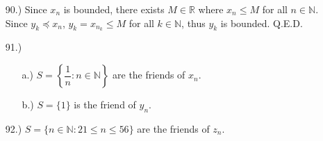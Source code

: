 \documentclass[12pt]{article}
\begin{document}
\begin{itemize}






    \item [90.)] Since $x_n$ is bounded, there exists $M\in\mathbb{R}$ where $x_n\leq M$ for all $n\in\mathbb{N}$. Since $y_k\preceq x_n$, $y_k=x_{n_k}\leq M$ for all $k\in\mathbb{N}$, thus $y_k$ is bounded. Q.E.D.

    \item [91.)] \begin{itemize}
        \item [a.)] $S=\left\{\dfrac{1}{n}:n\in\mathbb{N}\right\}$ are the friends of $x_n$.

        \item [b.)] $S=\{1\}$ is the friend of $y_n$.
    \end{itemize}

    \item [92.)] $S=\{n\in\mathbb{N}:21\leq n\leq56\}$ are the friends of $z_n$.









\end{itemize}
\end{document}
